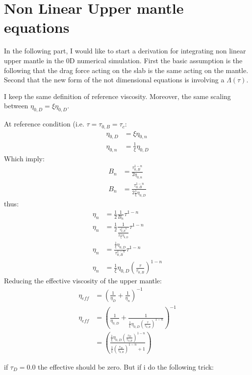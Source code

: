 \documentclass{article}
\begin{document}
\section{Non Linear Upper mantle equations }

In the following part, I would like to start a derivation for integrating non linear upper mantle in the 0D numerical simulation. First the basic assumption is the following that the drag force acting on the slab is the same acting on the mantle. Second that the new form of the not dimensional equations is involving a $\Lambda(\tau)$. 

I keep the same definition of reference viscosity. Moreover, the same scaling between $\eta_{0,D}=\xi\eta_{0,D}$. 

At reference condition (i.e. $\tau = \tau_{0,B} = \tau_c$: 
\begin{align}
    \eta_{0,D} &= \xi \eta_{0,n}\\
    \eta_{0,n} &= \frac{1}{\xi} \eta_{0,D}
\end{align}
Which imply: 
\begin{align}
    B_n        &= \frac{\tau_{0,B}^{1-n}}{2\eta_{0,n}}\\
    B_n        &= \frac{\tau_{0,B}^{1-n}}{2\frac{1}{\xi}\eta_{0,D}}    
\end{align}
thus: 
\begin{align}
    \eta_{n} &= \frac{1}{2}\frac{1}{B_n}\tau^{1-n}\\
    \eta_{n} &= \frac{1}{2}\frac{1}{\frac{\tau_{0,B}^{1-n}}{2\frac{1}{\xi}\eta_{0,D}} }\tau^{1-n}\\
    \eta_{n} &= \frac{\frac{1}{\xi}\eta_{0,D}}{{\tau_{0,B}^{1-n}} }\tau^{1-n}\\
    \eta_{n} &= \frac{1}{\xi}\eta_{0,D} \left(\frac{\tau}{\tau_{0,B}}\right)^{1-n}
\end{align}
Reducing the effective viscosity of the upper mantle: 
\begin{align}
    \eta_{eff} &= \left(\frac{1}{\eta_D}+\frac{1}{\eta_n}\right)^{-1}\\
    \eta_{eff} &= \left(\frac{1}{\eta_{0,D}}+\frac{1}{\frac{1}{\xi}\eta_{0,D} \left(\frac{\tau}{\tau_{0,B}}\right)^{1-n}}\right)^{-1}\\
    &= \left( \frac{\frac{1}{\xi}\eta_{0,D}\left(\frac{\tau_D}{\tau_{0,B}}\right)^{1-n}}{\frac{1}{\xi}\left(\frac{\tau_D}{\tau_{0,B}}\right)^{1-n}+1}\right)
\end{align}

if $\tau_D = 0.0$  the effective should be zero. But if i do the following trick: 
\end{document}
